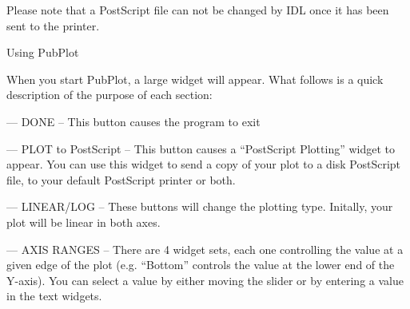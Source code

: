 \noindent Please note that a PostScript file can not be changed by IDL once it 
has 
been sent to the printer.

\vskip 3mm \centerline{\rmtwelve Using PubPlot}

When you start PubPlot, a large widget will appear.  What follows is a 
quick description of the purpose of each section:

\item{---} DONE -- This button causes the program to exit
\item{---} PLOT to PostScript -- This button causes a ``PostScript Plotting''
 	widget to appear.  You can use this widget to send a copy of your plot
	to a disk PostScript file, to your default PostScript printer or both.
\item{---} LINEAR/LOG -- These buttons will change the plotting type.  
	Initally, your plot will be linear in both axes.
\item{---} AXIS RANGES -- There are 4 widget sets, each one controlling the 
	value at a given edge of the plot (e.g. ``Bottom'' controls the value
	at the lower end of the Y-axis).  You can select a value by either
	moving the slider or by entering a value in the text widgets. 

